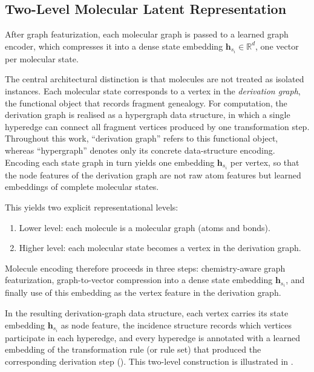\subsection{Two-Level Molecular Latent Representation}

After graph featurization, each molecular graph is passed to a learned graph encoder, which compresses it into a dense state embedding $\mathbf{h}_{s_i} \in \mathbb{R}^{d}$, one vector per molecular state.

The central architectural distinction is that molecules are not treated as isolated instances.
Each molecular state corresponds to a vertex in the \emph{derivation graph}, the functional object that records fragment genealogy.
For computation, the derivation graph is realised as a hypergraph data structure, in which a single hyperedge can connect all fragment vertices produced by one transformation step.
Throughout this work, \enquote{derivation graph} refers to this functional object, whereas \enquote{hypergraph} denotes only its concrete data-structure encoding.
Encoding each state graph in turn yields one embedding $\mathbf{h}_{s_i}$ per vertex, so that the node features of the derivation graph are not raw atom features but learned embeddings of complete molecular states.

This yields two explicit representational levels:
\begin{enumerate}
    \item Lower level: each molecule is a molecular graph (atoms and bonds).
    \item Higher level: each molecular state becomes a vertex in the derivation graph.
\end{enumerate}

Molecule encoding therefore proceeds in three steps:
chemistry-aware graph featurization,
graph-to-vector compression into a dense state embedding $\mathbf{h}_{s_i}$,
and finally use of this embedding as the vertex feature in the derivation graph.

In the resulting derivation-graph data structure, each vertex carries its state embedding $\mathbf{h}_{s_i}$ as node feature, the incidence structure records which vertices participate in each hyperedge, and every hyperedge is annotated with a learned embedding of the transformation rule (or rule set) that produced the corresponding derivation step (). This two-level construction is illustrated in .

